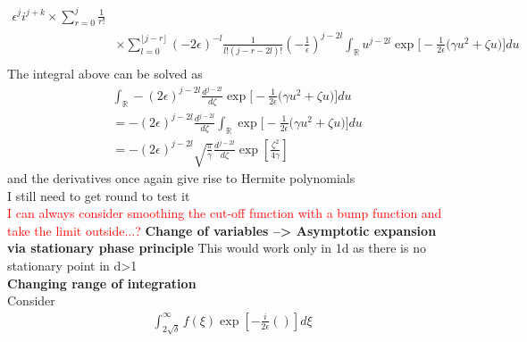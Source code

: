 \documentclass[12pt]{article}
\numberwithin{equation}{section}
\begin{document}
\begin{appendices}
\begin{equation}
\begin{split}
      \epsilon^j
      i^{j + k}
    \times
    \sum_{r=0}^j \frac{1}{r!} 
    \\
    &\times 
    \sum_{l=0}^{\lfloor{j-r}\rfloor}
    (-2\epsilon)^{-l}\frac{1}{l!(j - r -2l)!}
    \left(-\frac{1}{\epsilon}
    \right)^{j -2l}
    \int_{\mathbb{R}} 
    u^{j - 2l}
    \exp \Bigg[-\frac{1}{2\epsilon} 
      \Big( \gamma u^2
        +
        \zeta u
      \Big) 
    \Bigg]  d u 
    \\
  \end{split}
\end{equation}
The integral above can be solved as 
\begin{equation}
  \begin{split}
    &\int_{\mathbb{R}} 
    -(2\epsilon)^{j-2l}
    \frac{d^{j-2l}}{d\zeta}
    \exp \Bigg[-\frac{1}{2\epsilon} 
      \Big( \gamma u^2
        +
        \zeta u
      \Big) 
    \Bigg]  d u 
    \\
    &=
    -(2\epsilon)^{j-2l}
    \frac{d^{j-2l}}{d\zeta}
    \int_{\mathbb{R}} 
    \exp \Bigg[-\frac{1}{2\epsilon} 
      \Big( \gamma u^2
        +
        \zeta u
      \Big) 
    \Bigg]  d u 
    \\
    &=
    -(2\epsilon)^{j-2l}
    \sqrt{\frac{\pi}{\gamma}} 
    \frac{d^{j-2l}}{d\zeta}
    \exp{\left[
      \frac{\zeta^2}{4\gamma}
    \right]}
  \end{split}
\end{equation}
and the derivatives once again give rise to Hermite 
polynomials
\\
I still need to get round to test it 
\\
\textcolor{red}{I can always consider smoothing the cut-off function with a bump function and take the 
limit outside...?}
%
\newpage
\textbf{Change of variables --> Asymptotic expansion via stationary phase principle}
This would work only in 1d as there is no stationary point in d>1
\\
\textbf{Changing range of integration}
\\
Consider 
\begin{equation}
  \begin{split}
    \int_{2\sqrt{\delta}}^\infty f(\xi) \exp{\left[-\frac{i}{2\epsilon} ()  \right]} d\xi
  \end{split}
\end{equation}
\\

\end{appendices}
\end{document}
